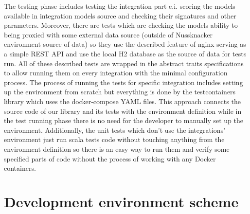 The testing phase includes testing the integration part e.i. scoring the models available in integration
models source and checking their signatures and other parameters. Moreover, there are tests which are
checking the models ability to being proxied with some external data source (outside of Nussknacker
environment source of data) so they use the described feature of nginx serving as a simple REST API
and use the local H2 database as the source of data for tests run. All of these described tests are
wrapped in the abstract traits specifications to allow running them on every integration with the minimal
configuration process. The process of running the tests for specific integration includes setting up the
environment from scratch but everything is done by the testcontainers library which uses the docker-compose
YAML files. This approach connects the source code of our library and its tests with the environment
definition while in the test running phase there is no need for the developer to manually set up the
environment. Additionally, the unit tests which don’t use the integrations’ environment just run scala
tests code without touching anything from the environment definition so there is an easy way to run them
and verify some specified parts of code without the process of working with any Docker containers.

\section{Development environment scheme}

\scalebox{0.8}{}
